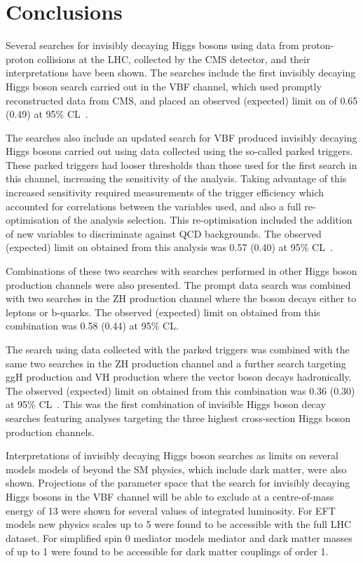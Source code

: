 \chapter{Conclusions}
\label{chap:conclusions}
Several searches for invisibly decaying Higgs bosons using data from proton-proton collisions at the LHC, collected by the CMS detector, and their interpretations have been shown. The searches include the first invisibly decaying Higgs boson search carried out in the \ac{VBF} channel, which used promptly reconstructed data from CMS, and placed an observed (expected) limit on \BRinv of 0.65 (0.49) at 95\% \ac{CL}~\cite{Chatrchyan:2014tja}.

The searches also include an updated search for \ac{VBF} produced invisibly decaying Higgs bosons carried out using data collected using the so-called parked triggers. These parked triggers had looser thresholds than those used for the first search in this channel, increasing the sensitivity of the analysis. Taking advantage of this increased sensitivity required measurements of the trigger efficiency which accounted for correlations between the variables used, and also a full re-optimisation of the analysis selection. This re-optimisation included the addition of new variables to discriminate against \ac{QCD} backgrounds. The observed (expected) limit on \BRinv obtained from this analysis was 0.57 (0.40) at 95\% \ac{CL}~\cite{CMS-PAS-HIG-14-038}.

Combinations of these two searches with searches performed in other Higgs boson production channels were also presented. The prompt data search was combined with two searches in the ZH production channel where the \PZ boson decays either to leptons or b-quarks. The observed (expected) limit on \BRinv obtained from this combination was 0.58 (0.44) at 95\% \ac{CL}.

The search using data collected with the parked triggers was combined with the same two searches in the ZH production channel and a further search targeting \ac{ggH} production and VH production where the vector boson decays hadronically. The observed (expected) limit on \BRinv obtained from this combination was 0.36 (0.30) at 95\% \ac{CL}~\cite{CMS-PAS-HIG-15-012}. This was the first combination of invisible Higgs boson decay searches featuring analyses targeting the three highest cross-section Higgs boson production channels.

Interpretations of invisibly decaying Higgs boson searches as limits on several models models of beyond the \ac{SM} physics, which include dark matter, were also shown. Projections of the parameter space that the search for invisibly decaying Higgs bosons in the \ac{VBF} channel will be able to exclude at a centre-of-mass energy of 13 \TeV were shown for several values of integrated luminosity. For \ac{EFT} models new physics scales up to 5 \TeV were found to be accessible with the full LHC dataset. For simplified spin 0 mediator models mediator and dark matter masses of up to 1 \TeV were found to be accessible for dark matter couplings of order 1.

